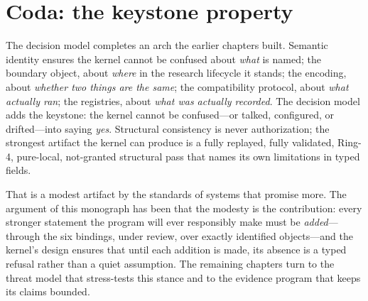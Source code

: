 \section{Coda: the keystone property}\label{ch09:coda}

The decision model completes an arch the earlier chapters built. Semantic identity ensures the kernel cannot be confused about \emph{what} is named; the boundary object, about \emph{where} in the research lifecycle it stands; the encoding, about \emph{whether two things are the same}; the compatibility protocol, about \emph{what actually ran}; the registries, about \emph{what was actually recorded}. The decision model adds the keystone: the kernel cannot be confused---or talked, configured, or drifted---into saying \emph{yes}. Structural consistency is never authorization; the strongest artifact the kernel can produce is a fully replayed, fully validated, Ring-4, pure-local, not-granted structural pass that names its own limitations in typed fields.

That is a modest artifact by the standards of systems that promise more. The argument of this monograph has been that the modesty is the contribution: every stronger statement the program will ever responsibly make must be \emph{added}---through the six bindings, under review, over exactly identified objects---and the kernel's design ensures that until each addition is made, its absence is a typed refusal rather than a quiet assumption. The remaining chapters turn to the threat model that stress-tests this stance and to the evidence program that keeps its claims bounded.
